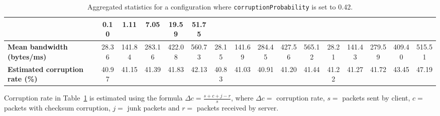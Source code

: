 \begin{table}[!h]
{\begin{tabular}{|l|ccccc|ccccc|ccccc|}
            & \multicolumn{1}{c|}{0.10}
            & \multicolumn{1}{c|}{1.11}
            & \multicolumn{1}{c|}{7.05}
            & \multicolumn{1}{c|}{19.59}
            & \multicolumn{1}{c|}{51.75}
            \\ \hline
            \textbf{Mean bandwidth (bytes/ms)} & \multicolumn{1}{c|}{28.36} & \multicolumn{1}{c|}{141.84}
            & \multicolumn{1}{c|}{283.16}
            & \multicolumn{1}{c|}{422.08}
            & \multicolumn{1}{c|}{560.73}
            & \multicolumn{1}{c|}{28.15}
            & \multicolumn{1}{c|}{141.69}
            & \multicolumn{1}{c|}{284.45}
            & \multicolumn{1}{c|}{427.56}
            & \multicolumn{1}{c|}{565.12}
            & \multicolumn{1}{c|}{28.21}
            & \multicolumn{1}{c|}{141.43}
            & \multicolumn{1}{c|}{279.59}
            & \multicolumn{1}{c|}{409.40}
            & \multicolumn{1}{c|}{515.51}
            \\ \hline
            \textbf{Estimated corruption rate (\%)} & \multicolumn{1}{c|}{40.97} & \multicolumn{1}{c|}{41.15}
            & \multicolumn{1}{c|}{41.39}
            & \multicolumn{1}{c|}{41.83}
            & \multicolumn{1}{c|}{42.13}
            & \multicolumn{1}{c|}{40.83}
            & \multicolumn{1}{c|}{41.03}
            & \multicolumn{1}{c|}{40.91}
            & \multicolumn{1}{c|}{41.20}
            & \multicolumn{1}{c|}{41.44}
            & \multicolumn{1}{c|}{41.22}
            & \multicolumn{1}{c|}{41.27}
            & \multicolumn{1}{c|}{41.72}
            & \multicolumn{1}{c|}{43.45}
            & \multicolumn{1}{c|}{47.19}
            \\ \hline
        \end{tabular}
    }
    \caption{Aggregated statistics for a configuration where \texttt{corruptionProbability} is set to 0.42.}
    \label{table:analysis_results_corruption}
\end{table}

Corruption rate in Table~\ref{table:analysis_results_corruption} is estimated using the formula $\Delta c = \frac{s
+ c + j - r}{s}$, where $\Delta c = $ corruption rate, $s = $ packets sent by client, $c = $ packets with checksum
corruption, $j = $ junk packets and $r = $ packets received by server.

